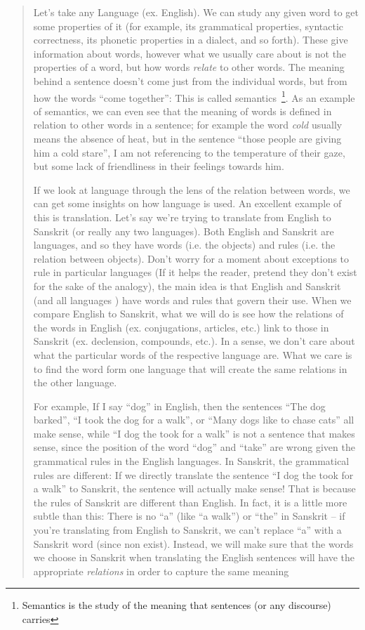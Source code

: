 \documentclass{book}
\begin{document}
\begin{quote}
	Let's take any Language (ex. English). We can study any given word to get some properties of it (for example, its
	grammatical properties, syntactic correctness, its phonetic properties in a dialect, and so forth). These
	give information about words, however what
	we usually care about is not the properties of a word, but how words \emph{relate} to other words. The meaning
	behind a sentence doesn't come just from the individual words, but from how the words ``come together'': This is
	called semantics~\footnote{Semantics is the study of the meaning that sentences (or any discourse) carries}. As an
	example of semantics, we can
	even see that the meaning of words is defined in relation to other words in a sentence; for example the
	word \emph{cold} usually means the absence of heat, but in the sentence ``those people are giving
	him a cold stare'', I am not referencing to the temperature of their gaze, but some lack of friendliness in
	their feelings towards him.

	If we look at language through the lens of the relation between words, we can get some insights on how language is
	used. An excellent example of this is translation. Let's say we're trying to translate from English to Sanskrit (or
	really any two languages). Both English and Sanskrit are languages, and so they have words (i.e. the objects) and
	rules (i.e. the relation between objects). Don't worry for a moment about exceptions to rule in particular languages
	(If it helps the reader, pretend they don't exist for the sake of the analogy), the main idea is that English and Sanskrit (and all
	languages ) have words and rules that govern their use. When we compare English to Sanskrit, what we will do is see
	how the relations of the words in English (ex. conjugations, articles, etc.) link to those in Sanskrit (ex.
	declension, compounds, etc.). In a sense, we don't care about what the particular words of the respective
	language are. What we care is to find the word form one language that will create the same relations in the other
	language.

	For example, If I say ``dog'' in English, then the sentences ``The dog barked'', ``I took the dog for a walk'', or
	``Many dogs like to chase cats'' all make sense, while ``I dog the took for a walk'' is not a sentence that makes
	sense, since the position of the word ``dog'' and ``take'' are wrong given the grammatical rules in the English
	languages. In Sanskrit, the grammatical rules
	are different: If we directly translate the sentence ``I dog the took for a walk'' to Sanskrit, the
	sentence will actually make sense! That is because the rules of Sanskrit are different than English. In fact, it is
	a little more subtle than this: There is no ``a'' (like ``a walk'')  or ``the'' in Sanskrit -- if you're translating from
	English to Sanskrit, we can't replace ``a'' with a Sanskrit word (since non exist). Instead, we will make sure that
	the words we choose in Sanskrit when translating the English sentences will have the appropriate \emph{relations} in order
	to capture the same meaning
\end{quote}
\end{document}
